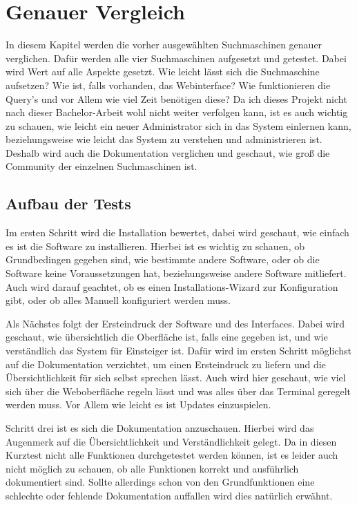 \chapter{Genauer Vergleich}

In diesem Kapitel werden die vorher ausgewählten Suchmaschinen genauer verglichen. Dafür werden alle vier Suchmaschinen aufgesetzt und getestet. Dabei wird Wert auf alle Aspekte gesetzt. Wie leicht lässt sich die Suchmaschine aufsetzen? Wie ist, falls vorhanden, das Webinterface? Wie funktionieren die Query’s und vor Allem wie viel Zeit benötigen diese? Da ich dieses Projekt nicht nach dieser Bachelor-Arbeit wohl nicht weiter verfolgen kann, ist es auch wichtig zu schauen, wie leicht ein neuer Administrator sich in das System einlernen kann, beziehungsweise wie leicht das System zu verstehen und administrieren ist. Deshalb wird auch die Dokumentation verglichen und geschaut, wie groß die Community der einzelnen Suchmaschinen ist. 

\section{Aufbau der Tests}

Im ersten Schritt wird die Installation bewertet, dabei wird geschaut, wie einfach es ist die Software zu installieren. Hierbei ist es wichtig zu schauen, ob Grundbedingen gegeben sind, wie bestimmte andere Software, oder ob die Software keine Voraussetzungen hat, beziehungsweise andere Software mitliefert. Auch wird darauf geachtet, ob es einen Installations-Wizard zur Konfiguration gibt, oder ob alles Manuell konfiguriert werden muss.

Als Nächstes folgt der Ersteindruck der Software und des Interfaces. Dabei wird geschaut, wie übersichtlich die Oberfläche ist, falls eine gegeben ist, und wie verständlich das System für Einsteiger ist. Dafür wird im ersten Schritt möglichst auf die Dokumentation verzichtet, um einen Ersteindruck zu liefern und die Übersichtlichkeit für sich selbst sprechen lässt. Auch wird hier geschaut, wie viel sich über die Weboberfläche regeln lässt und was alles über das Terminal geregelt werden muss. Vor Allem wie leicht es ist Updates einzuspielen.

Schritt drei ist es sich die Dokumentation anzuschauen. Hierbei wird das Augenmerk auf die Übersichtlichkeit und Verständlichkeit gelegt. Da in diesen Kurztest nicht alle Funktionen durchgetestet werden können, ist es leider auch nicht möglich zu schauen, ob alle Funktionen korrekt und ausführlich dokumentiert sind. Sollte allerdings schon von den Grundfunktionen eine schlechte oder fehlende Dokumentation auffallen wird dies natürlich erwähnt. 

